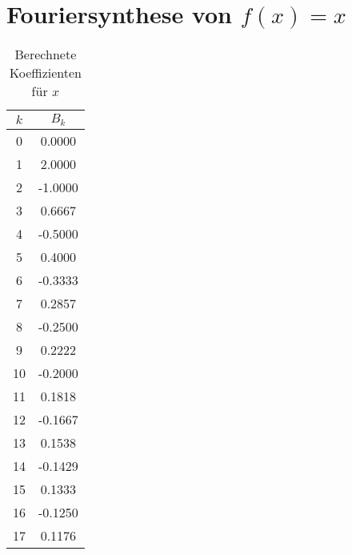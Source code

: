 \section{Fouriersynthese von $f(x)=x$}

\begin{table}
  \centering
  \caption{Berechnete Koeffizienten für $x$}
  \label{tab:a_sin}
  \begin{tabular}{c c}
    \toprule 
    $k$ & $B_k$ \\ 
    \midrule 
    0 & 0.0000 \\
    1 & 2.0000 \\
    2 & -1.0000 \\
    3 & 0.6667 \\
    4 & -0.5000 \\
    5 & 0.4000 \\
    6 & -0.3333 \\
    7 & 0.2857 \\
    8 & -0.2500 \\
    9 & 0.2222 \\
    10 & -0.2000 \\
    11 & 0.1818 \\
    12 & -0.1667 \\
    13 & 0.1538 \\
    14 & -0.1429 \\
    15 & 0.1333 \\
    16 & -0.1250 \\
    17 & 0.1176 \\ 
    \bottomrule
  \end{tabular}
\end{table} 